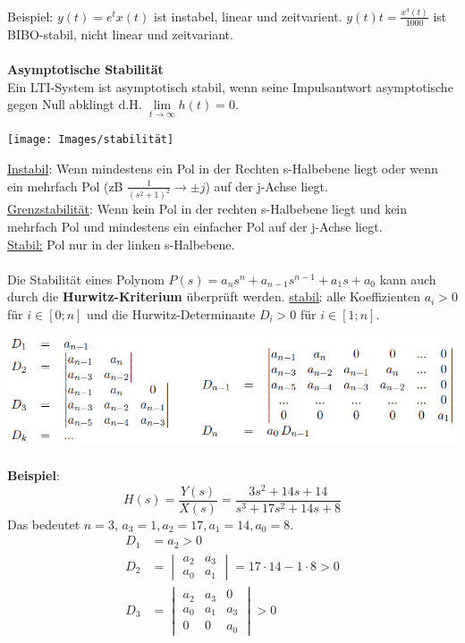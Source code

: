 Beispiel: $y(t) = e^tx(t)$ ist instabel, linear und zeitvarient. $y(t)t = \frac{x^4(t)}{1000}$ ist BIBO-stabil, nicht linear und zeitvariant.
\\ ~\\
\textbf{Asymptotische Stabilität}\\ 
Ein LTI-System ist asymptotisch stabil, wenn seine Impulsantwort asymptotische gegen Null abklingt d.H. $\lim\limits_{t\rightarrow\infty}h(t) = 0$.

\begin{center}
\texttt{[image: Images/stabilität]}
\end{center}

\noindent\underline{Instabil}: Wenn mindestens ein Pol in der Rechten s-Halbebene liegt oder wenn ein mehrfach Pol (zB $\frac{1}{(s^2 + 1)^2} \rightarrow \pm j$) auf der j-Achse liegt.\\
\underline{Grenzstabilität}: Wenn kein Pol in der rechten s-Halbebene liegt und kein mehrfach Pol und mindestens ein einfacher Pol auf der j-Achse liegt.\\
\underline{Stabil:} Pol nur in der linken s-Halbebene.\\

~\\
Die Stabilität eines Polynom $P(s) = a_ns^n + a_{n-1}s^{n-1}+a_1s + a_0$ kann auch durch die \textbf{Hurwitz-Kriterium} überprüft werden. 
\underline{stabil}: alle Koeffizienten $a_i > 0$ für $i \in [0;n]$ und die Hurwitz-Determinante $D_i > 0$ für $i\in[1;n]$.

\includegraphics[width=\columnwidth]{Images/hurwitz}
\\ ~\\
\textbf{Beispiel}:
\[
H(s) = \frac{Y(s)}{X(s)} = \frac{3s^2 + 14s + 14}{s^3 + 17s^2 + 14s + 8}
\]
Das bedeutet $n=3$, $a_3 = 1, a_2=17, a_1 = 14, a_0=8$. 
\begin{align*}
	D_1 &= a_2 > 0 \\
	D_2 &= \begin{vmatrix*} a_2 & a_3 \\ a_0 & a_1 \end{vmatrix*} = 17\cdot 14 - 1\cdot 8 > 0 \\
	D_3 &= \begin{vmatrix*} a_2 & a_3 & 0 \\ a_0 & a_1 & a_3 \\ 0 & 0 & a_0	\end{vmatrix*} > 0
\end{align*}


